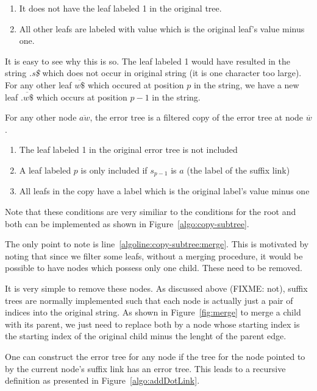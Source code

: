\documentclass[letter,10pt]{article}
\newcommand{\putstring}[1]{\textsl{#1}}
\begin{document}
\begin{enumerate}
\item It does not have the leaf labeled 1 in the original tree.
\item All other leafs are labeled with value which is the original leaf's value minus one.
\end{enumerate}

It is easy to see why this is so. The leaf labeled 1 would have resulted in the string \putstring{.s\$} which does not occur in original string (it is one character too large). For any other leaf $\overline{w\$}$ which occured at position $p$ in the string, we have a new leaf $\overline{.w\$}$ which occurs at position $p-1$ in the string.

For any other node $\overline{aw}$, the error tree is a filtered copy of the error tree at node $\overline{w}$.

\begin{enumerate}
\item The leaf labeled 1 in the original error tree is not included
\item A leaf labeled $p$ is only included if $s_{p-1}$ is $a$ (the label of the suffix link)
\item All leafs in the copy have a label which is the original label's value minus one
\end{enumerate}

Note that these conditions are very similiar to the conditions for the root and both can be implemented as shown in Figure~\ref{algo:copy-subtree}.



The only point to note is line~\ref{algoline:copy-subtree:merge}. This is motivated by noting that since we filter some leafs, without a merging procedure, it would be possible to have nodes which possess only one child. These need to be removed.

It is very simple to remove these nodes. As discussed above (FIXME: not), suffix trees are normally implemented such that each node is actually just a pair of indices into the original string. As shown in Figure~\ref{fig:merge} to merge a child with its parent, we just need to replace both by a node whose starting index is the starting index of the original child minus the lenght of the parent edge.



One can construct the error tree for any node if the tree for the node pointed to by the current node's suffix link has an error tree. This leads to a recursive definition as presented in Figure~\ref{algo:addDotLink}. 
\end{document}
